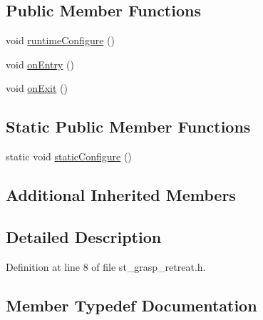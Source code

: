 \subsection*{Public Member Functions}
\begin{DoxyCompactItemize}
\item 
void \hyperlink{structsm__moveit__4_1_1pick__states_1_1StGraspRetreat_a2d386f511e377a4b0eb8193cd24ddb84}{runtime\+Configure} ()
\item 
void \hyperlink{structsm__moveit__4_1_1pick__states_1_1StGraspRetreat_a72c11fb9d9c2a1180314e03b436334d7}{on\+Entry} ()
\item 
void \hyperlink{structsm__moveit__4_1_1pick__states_1_1StGraspRetreat_aba04f694c6c7c664a0c6a6e10c8ce0f1}{on\+Exit} ()
\end{DoxyCompactItemize}
\subsection*{Static Public Member Functions}
\begin{DoxyCompactItemize}
\item 
static void \hyperlink{structsm__moveit__4_1_1pick__states_1_1StGraspRetreat_a678250d9b3296956f285a2bc27af6641}{static\+Configure} ()
\end{DoxyCompactItemize}
\subsection*{Additional Inherited Members}


\subsection{Detailed Description}


Definition at line 8 of file st\+\_\+grasp\+\_\+retreat.\+h.



\subsection{Member Typedef Documentation}
\mbox{\label{structsm__moveit__4_1_1pick__states_1_1StGraspRetreat_a4f5f191fa9aeaa24fd24043f983f43a8}} 
